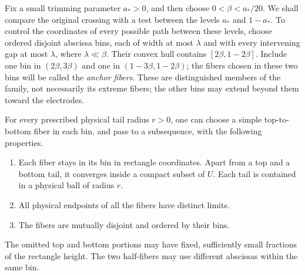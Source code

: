 Fix a small trimming parameter $a_*>0$, and then choose
$0<\beta<a_*/20$.  We shall compare the original crossing with a
test between the levels $a_*$ and $1-a_*$.  To control the coordinates
of every possible path between these levels, choose ordered disjoint
abscissa bins, each of width at most $\lambda$ and with every
intervening gap at most $\lambda$, where $\lambda\ll\beta$.
Their convex hull contains
$[2\beta,1-2\beta]$.  Include one bin in $(2\beta,3\beta)$ and one
in $(1-3\beta,1-2\beta)$; the fibers chosen in these two bins will
be called the \emph{anchor fibers}.  These are distinguished members
of the family, not necessarily its extreme fibers; the other bins
may extend beyond them toward the electrodes.

\begin{lemma}\label{lem:slits-fibers}
For every prescribed physical tail radius $r>0$, one can choose a
simple top-to-bottom fiber in each bin, and pass to a subsequence,
with the following properties.
\begin{enumerate}
\item Each fiber stays in its bin in rectangle coordinates.  Apart
  from a top and a bottom tail, it converges inside a compact subset
  of $U$.  Each tail is contained in a physical ball of radius $r$.
\item All physical endpoints of all the fibers have distinct limits.
\item The fibers are mutually disjoint and ordered by their bins.
\end{enumerate}
The omitted top and bottom portions may have fixed, sufficiently
small fractions of the rectangle height.  The two half-fibers may
use different abscissas within the same bin.
\end{lemma}

